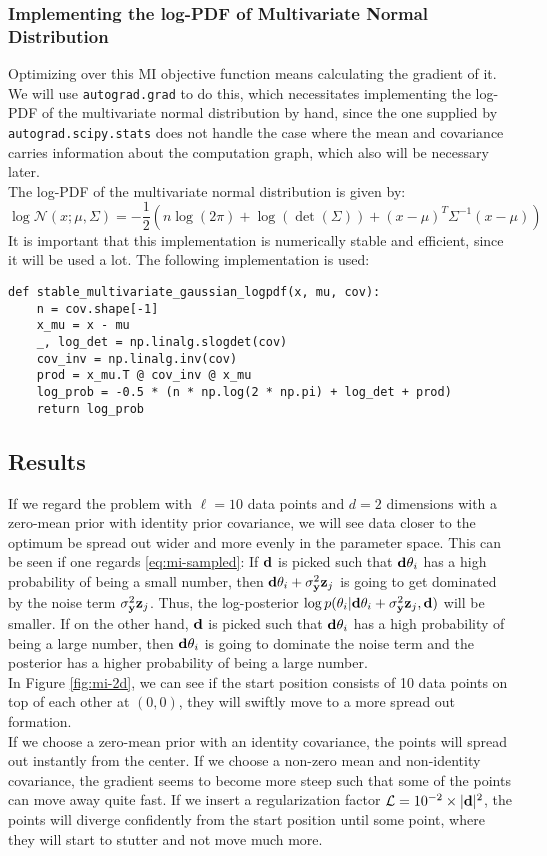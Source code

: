 \subsubsection{Implementing the log-PDF of Multivariate Normal Distribution}
Optimizing over this MI objective function means calculating the gradient of it. 
We will use \texttt{autograd.grad} to do this, which necessitates implementing the log-PDF of the multivariate normal distribution by hand, 
since the one supplied by \texttt{autograd.scipy.stats} does not handle the case where the mean and covariance carries information about the computation graph, which also will be necessary later.\\
The log-PDF of the multivariate normal distribution is given by:
\begin{equation}
  \log \mathcal{N}(x; \mu, \Sigma) = -\frac{1}{2}(n\log(2\pi) + \log(\det(\Sigma)) + (x - \mu)^T\Sigma^{-1}(x - \mu))
\end{equation}
It is important that this implementation is numerically stable and efficient, since it will be used a lot.
The following implementation is used:
\begin{verbatim}
def stable_multivariate_gaussian_logpdf(x, mu, cov):
    n = cov.shape[-1]
    x_mu = x - mu
    _, log_det = np.linalg.slogdet(cov)
    cov_inv = np.linalg.inv(cov)
    prod = x_mu.T @ cov_inv @ x_mu
    log_prob = -0.5 * (n * np.log(2 * np.pi) + log_det + prod)
    return log_prob
\end{verbatim}
\subsection{Results}
If we regard the problem with $\ell = 10$ data points and $d=2$ dimensions with a zero-mean prior with identity prior covariance, 
we will see data closer to the optimum be spread out wider and more evenly in the parameter space.
This can be seen if one regards \eqref{eq:mi-sampled}:
If $\mathbf{d}$ is picked such that $\mathbf{d}\theta_i$ has a high probability of being a small number, then
$\mathbf{d}\theta_i + \sigma^2_{\mathbf{y}}\mathbf{z}_j$ is going to get dominated by the noise term $\sigma^2_{\mathbf{y}}\mathbf{z}_j$.
Thus, the log-posterior $\log p(\theta_i | \mathbf{d}\theta_i + \sigma^2_{\mathbf{y}}\mathbf{z}_j, \mathbf{d})$ will be smaller.
If on the other hand, $\mathbf{d}$ is picked such that $\mathbf{d}\theta_i$ has a high probability of being a large number, then $\mathbf{d}\theta_i$ is going to dominate the noise term
and the posterior has a higher probability of being a large number.\\
In Figure \ref{fig:mi-2d}, we can see if the start position consists of 10 data points on top of each other at $(0,0)$, they will swiftly move to a more spread out formation.\\
If we choose a zero-mean prior with an identity covariance, the points will spread out instantly from the center. If we choose a non-zero mean and non-identity covariance, 
the gradient seems to become more steep such that some of the points can move away quite fast.
If we insert a regularization factor $\mathcal{L} = 10^{-2}\times |\mathbf{d}|^2$, the points will diverge confidently from the start position until some point, where they will start to stutter and not move much more.

